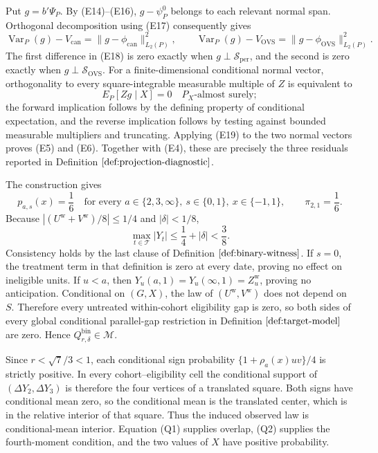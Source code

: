 Put \(g=b'\Psi_P\).  By (E14)--(E16), \(g-\psi_P^0\) belongs to each relevant normal span.  Orthogonal decomposition using (E17) consequently gives
\[
 \operatorname{Var}_P(g)-V_{\mathrm{can}}
 =\|g-\phi_{\mathrm{can}}\|_{L_2(P)}^2,
 \qquad
 \operatorname{Var}_P(g)-V_{\mathrm{OVS}}
 =\|g-\phi_{\mathrm{OVS}}\|_{L_2(P)}^2.
\tag{E18}
\]
The first difference in (E18) is zero exactly when \(g\perp\mathscr S_{\mathrm{per}}\), and the second is zero exactly when \(g\perp\mathscr S_{\mathrm{OVS}}\).  For a finite-dimensional conditional normal vector, orthogonality to every square-integrable measurable multiple of \(Z\) is equivalent to
\[
 E_P[Zg\mid X]=0
\quad P_X\text{-almost surely};
\tag{E19}
\]
the forward implication follows by the defining property of conditional expectation, and the reverse implication follows by testing against bounded measurable multipliers and truncating.  Applying (E19) to the two normal vectors proves (E5) and (E6).  Together with (E4), these are precisely the three residuals reported in Definition \(\ref{def:projection-diagnostic}\).

The construction gives
\[
 p_{a,s}(x)=\frac16
 \quad\text{for every }a\in\{2,3,\infty\},\ s\in\{0,1\},\ x\in\{-1,1\},
 \qquad \pi_{2,1}=\frac16.
\tag{Q1}
\]
Because \(|(U^{\mathrm w}+V^{\mathrm w})/8|\le 1/4\) and \(|\delta|<1/8\),
\[
 \max_{t\in\mathcal T}|Y_t|
 \le \frac14+|\delta|<\frac38.
\tag{Q2}
\]
Consistency holds by the last clause of Definition \(\ref{def:binary-witness}\).  If \(s=0\), the treatment term in that definition is zero at every date, proving no effect on ineligible units.  If \(u<a\), then \(Y_u(a,1)=Y_u(\infty,1)=Z_u^{\mathrm w}\), proving no anticipation.  Conditional on \((G,X)\), the law of \((U^{\mathrm w},V^{\mathrm w})\) does not depend on \(S\).  Therefore every untreated within-cohort eligibility gap is zero, so both sides of every global conditional parallel-gap restriction in Definition \(\ref{def:target-model}\) are zero.  Hence \(Q^{\mathrm{bin}}_{r,\delta}\in\mathcal M\).

Since \(r<\sqrt7/3<1\), each conditional sign probability \(\{1+\rho_a(x)uv\}/4\) is strictly positive.  In every cohort--eligibility cell the conditional support of \((\Delta Y_2,\Delta Y_3)\) is therefore the four vertices of a translated square.  Both signs have conditional mean zero, so the conditional mean is the translated center, which is in the relative interior of that square.  Thus the induced observed law is conditional-mean interior.  Equation (Q1) supplies overlap, (Q2) supplies the fourth-moment condition, and the two values of \(X\) have positive probability.


